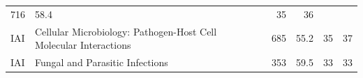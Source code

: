 \documentclass[11pt,]{article}
\begin{document}
\begin{longtable}[]{@{}llrrrr@{}}
\begin{minipage}[t]{0.04\columnwidth}
716\strut
\end{minipage} & \begin{minipage}[t]{0.08\columnwidth}\raggedleft\strut
58.4\strut
\end{minipage} & \begin{minipage}[t]{0.11\columnwidth}\raggedleft\strut
35\strut
\end{minipage} & \begin{minipage}[t]{0.11\columnwidth}\raggedleft\strut
36\strut
\end{minipage}\tabularnewline
\begin{minipage}[t]{0.06\columnwidth}\raggedright\strut
IAI\strut
\end{minipage} & \begin{minipage}[t]{0.43\columnwidth}\raggedright\strut
Cellular Microbiology: Pathogen-Host Cell Molecular Interactions\strut
\end{minipage} & \begin{minipage}[t]{0.04\columnwidth}\raggedleft\strut
685\strut
\end{minipage} & \begin{minipage}[t]{0.08\columnwidth}\raggedleft\strut
55.2\strut
\end{minipage} & \begin{minipage}[t]{0.11\columnwidth}\raggedleft\strut
35\strut
\end{minipage} & \begin{minipage}[t]{0.11\columnwidth}\raggedleft\strut
37\strut
\end{minipage}\tabularnewline
\begin{minipage}[t]{0.06\columnwidth}\raggedright\strut
IAI\strut
\end{minipage} & \begin{minipage}[t]{0.43\columnwidth}\raggedright\strut
Fungal and Parasitic Infections\strut
\end{minipage} & \begin{minipage}[t]{0.04\columnwidth}\raggedleft\strut
353\strut
\end{minipage} & \begin{minipage}[t]{0.08\columnwidth}\raggedleft\strut
59.5\strut
\end{minipage} & \begin{minipage}[t]{0.11\columnwidth}\raggedleft\strut
33\strut
\end{minipage} & \begin{minipage}[t]{0.11\columnwidth}\raggedleft\strut
33\strut
\end{minipage}\tabularnewline

\end{longtable}
\end{document}
